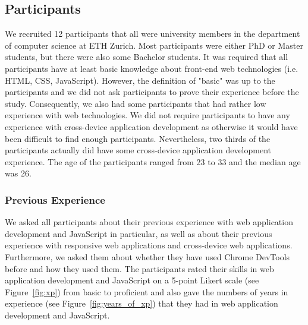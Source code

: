 \subsection{Participants}

We recruited 12 participants that all were university members in the department of computer science at ETH Zurich. Most participants were either PhD or Master students, but there were also some Bachelor students. It was required that all participants have at least basic knowledge about front-end web technologies (i.e. HTML, CSS, JavaScript). However, the definition of "basic" was up to the participants and we did not ask participants to prove their experience before the study. Consequently, we also had some participants that had rather low experience with web technologies. We did not require participants to have any experience with cross-device application development as otherwise it would have been difficult to find enough participants. Nevertheless, two thirds of the participants actually did have some cross-device application development experience. The age of the participants ranged from 23 to 33 and the median age was 26. 

\subsubsection{Previous Experience}
We asked all participants about their previous experience with web application development and JavaScript in particular, as well as about their previous experience with responsive web applications and cross-device web applications. Furthermore, we asked them about whether they have used Chrome DevTools before and how they used them. The participants rated their skills in web application development and JavaScript on a 5-point Likert scale (see Figure~\ref{fig:xp}) from basic to proficient and also gave the numbers of years in experience (see Figure~\ref{fig:years_of_xp}) that they had in web application development and JavaScript.


